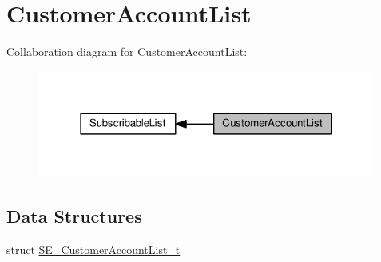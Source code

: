 \hypertarget{group__CustomerAccountList}{}\section{Customer\+Account\+List}
\label{group__CustomerAccountList}
Collaboration diagram for Customer\+Account\+List\+:\nopagebreak
\begin{figure}[H]
\begin{center}
\leavevmode
\includegraphics[width=316pt]{group__CustomerAccountList}
\end{center}
\end{figure}
\subsection*{Data Structures}
\begin{DoxyCompactItemize}
\item 
struct \hyperlink{structSE__CustomerAccountList__t}{S\+E\+\_\+\+Customer\+Account\+List\+\_\+t}
\end{DoxyCompactItemize}
